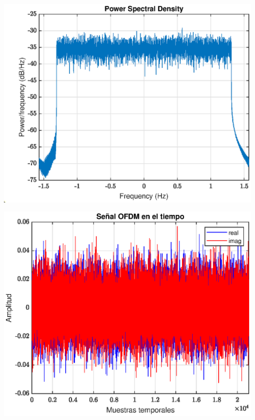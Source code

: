 \documentclass[11pt]{scrartcl} %
\begin{document}
\begin{preview}
\begin{minipage}{\linewidth}
	\label{fig2}
	\begin{center}
		\includegraphics[width=1\columnwidth,trim={0 0 1cm 0},clip]{../../Matlab/Figures/psd.eps} %
	\end{center}
\end{minipage}

\begin{minipage}{\linewidth}
	\begin{center}
		\includegraphics[width=1\columnwidth,trim={0 0 1cm 0},clip]{../../Matlab/Figures/muestrasTiempo.eps} %
	\end{center}
	\label{fig3}
\end{minipage}


\end{preview}
\end{document}
